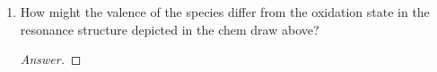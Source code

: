 \documentclass[../psets.tex]{subfiles}
\begin{document}
\begin{enumerate}
\begin{enumerate}[label={\alph*)}]
\begin{proof}[Answer]
            \quad exhibits no changes in oxidation state or $d$ count. This is a Z-type ligand.\\[9pt]
            \qquad exhibits no changes in oxidation state, $d$ count, or type (still Z-type).
        \end{proof}
        \item How might the valence of the species differ from the oxidation state in the resonance structure depicted in the chem draw above?
        \begin{proof}[Answer]


\end{proof}
\end{enumerate}
\end{enumerate}
\end{document}
